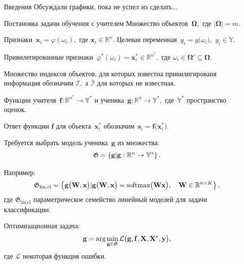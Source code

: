\documentclass[10pt,pdf,hyperref={unicode}]{beamer}
\begin{document}
\begin{frame}{Введения}
\justifying
{\color{red} Обсуждали графики, пока не успел из сделать...}
\end{frame}
\begin{frame}{Постановка задачи обучения с учителем}
\justifying
Множество объектов~$\bm{\Omega},$ где $\left|\bm{\Omega}\right| = m$.

Признаки~$\mathbf{x}_i = \varphi(\omega_i),$ где $\mathbf{x}_i \in \mathbb{R}^{n}$.
Целевая переменная~$y_i = y\bigr(\omega_i\bigr),$ $y_i \in \mathbb{Y}$.

Привилегированные признаки~$\varphi^*(\omega_i)=\mathbf{x}^*_i \in \mathbb{R}^{n^*},$ где  $\omega_i\in \bm{\Omega}' \subseteq \bm{\Omega}$.

Множество индексов объектов, для которых известна привилигированя информация обозначим $\mathcal{I},$ а $\bar{\mathcal{I}}$ для которых не известная.

Функции учителя~$\mathbf{f}:\mathbb{R}^{n^*} \to \mathbb{Y}^*$ и ученика~$\mathbf{g}:\mathbb{R}^{n} \to \mathbb{Y}^*,$ где~$\mathbb{Y}^*$ пространство оценок.

Ответ функции $\mathbf{f}$ для объекта~$\mathbf{x}^*_i$ обозначим~$\mathbf{s}_i = \mathbf{f}\bigr(\mathbf{x}_i^*\bigr)$.

Требуется выбрать модель ученика~$\mathbf{g}$ из множества:
\[
\setlength\abovedisplayskip{0pt}
	\mathfrak{G} = \left\{\mathbf{g}| \mathbf{g}:\mathbb{R}^{n} \to \mathbb{Y}^*\right\}.
\setlength\belowdisplayskip{0pt}
\]

Например: 
\[
\setlength\abovedisplayskip{0pt}
	\mathfrak{G}_\text{lin,cl} = \left\{\mathbf{g}\bigr(\mathbf{W}, \mathbf{x}\bigr)| \mathbf{g}\bigr(\mathbf{W}, \mathbf{x}\bigr) = \text{softmax}\bigr(\mathbf{W}\mathbf{x}\bigr), \quad \mathbf{W} \in \mathbb{R}^{n\times K}\right\},
\setlength\belowdisplayskip{0pt}
\]
где $\mathfrak{G}_\text{lin,cl}$ параметрическое семейство линейный моделей для задачи классификации.

Оптимизационная задача:
\[
\setlength\abovedisplayskip{0pt}
	\mathbf{g} = \arg\min_{\mathbf{g} \in \mathfrak{G}} \mathcal{L}\bigr(\mathbf{g}, \mathbf{f}, \mathbf{X}, \mathbf{X}^{*}, \mathbf{y}\bigr),
\setlength\belowdisplayskip{0pt}
\]
где $\mathcal{L}$ некоторая функция ошибки.
\end{frame}
\end{document}
